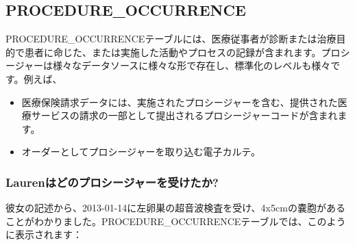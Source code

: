 \documentclass[
  11pt]{book}
\providecommand{\tightlist}{%
  \setlength{\itemsep}{0pt}\setlength{\parskip}{0pt}}
\theoremstyle{definition}
\theoremstyle{definition}
\theoremstyle{definition}
\theoremstyle{definition}
\theoremstyle{remark}
\begin{document}
\subsection{PROCEDURE\_OCCURRENCE}\label{procedureOccurrence}

PROCEDURE\_OCCURRENCEテーブルには、医療従事者が診断または治療目的で患者に命じた、または実施した活動やプロセスの記録が含まれます。プロシージャーは様々なデータソースに様々な形で存在し、標準化のレベルも様々です。例えば、

\begin{itemize}
\tightlist
\item
  医療保険請求データには、実施されたプロシージャーを含む、提供された医療サービスの請求の一部として提出されるプロシージャーコードが含まれます。
\item
  オーダーとしてプロシージャーを取り込む電子カルテ。
\end{itemize}

\subsubsection*{Laurenはどのプロシージャーを受けたか?}\label{laurenux306fux3069ux306eux30d7ux30edux30b7ux30fcux30b8ux30e3ux30fcux3092ux53d7ux3051ux305fux304b}

彼女の記述から、2013-01-14に左卵巣の超音波検査を受け、4x5cmの嚢胞があることがわかりました。PROCEDURE\_OCCURRENCEテーブルでは、このように表示されます：
\end{document}
